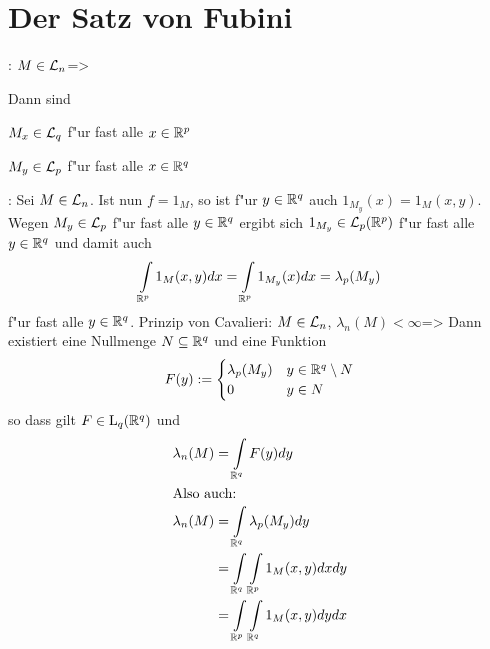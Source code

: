 \section{Der Satz von Fubini}
\theorem:
  $M\in\mathcal{L}_n$=>{
  Dann sind
  \begin{stmts}
    \item $M_x\in\mathcal{L}_q$ f"ur fast alle $x\in\mathbb R^p$
    \item $M_y\in\mathcal{L}_p$ f"ur fast alle $x\in\mathbb R^q$
    \end{stmts}
  }
\remark:{
  Sei $M\in\mathcal{L}_n$. Ist nun $f=1_M$, so ist f"ur $y\in\mathbb R^q$ auch
  $1_{M_y}(x)=1_M(x,y)$. Wegen $M_y\in\mathcal{L}_p$ f"ur fast alle $y\in\mathbb R^q$
  ergibt sich $1_{M_y}\in\mathcal{L}_p(\mathbb R^p)$ f"ur fast alle $y\in\mathbb R^q$ und
  damit auch
  \[\int_{\SetR^p} 1_M(x,y) dx = \int_{\SetR^p} 1_{M_y}(x) dx=\lambda_p(M_y)
    \]
  f"ur fast alle $y\in\mathbb R^q$.
  }
\theorem Prinzip von Cavalieri:
  $M\in\mathcal{L}_n$, $\lambda_n(M)<\infty$=>
  {
  Dann existiert eine Nullmenge $N\subseteq\mathbb R^q$ und eine Funktion
  \[F(y):=\begin{cases}
      \lambda_p(M_y) & y\in\mathbb R^q\setminus N \\
      0 & y\in N
      \end{cases}
    \]
  so dass gilt $F\in{\rm L}_q(\mathbb R^q)$ und
  \begin{align*}
    \lambda_n(M)&=\int_{\SetR^q} F(y)dy \\
    \intertext{Also auch:}
    \lambda_n(M)&=\int_{\SetR^q}\lambda_p(M_y)dy \\
                &=\int_{\SetR^q}\int_{\SetR^p} 1_M(x,y) dx dy \\
                &=\int_{\SetR^p}\int_{\SetR^q} 1_M(x,y) dy dx 
    \end{align*}
  }
